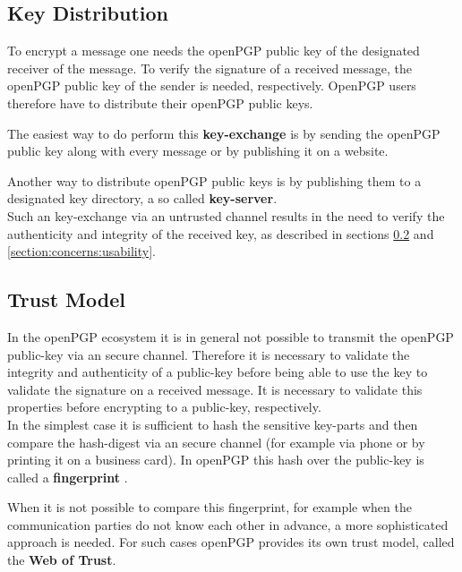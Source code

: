 \subsection{Key Distribution} \label{section:openpgp:keydistribution}

To encrypt a message one needs the openPGP public key of the designated receiver of the message.
To verify the signature of a received message, the openPGP public key of the sender is needed, respectively.
OpenPGP users therefore have to distribute their openPGP public keys.

The easiest way to do perform this \textbf{key-exchange} is by sending the openPGP public key along with every message or by publishing it on a website. 

Another way to distribute openPGP public keys is by publishing them to a designated key directory, a so called \textbf{key-server}. \\

Such an key-exchange via an untrusted channel results in the need to verify the authenticity and integrity of the received key, as described in sections \ref{section:openpgp:trustmodel} and \ref{section:concerns:usability}.

\subsection{Trust Model} \label{section:openpgp:trustmodel}

In the openPGP ecosystem it is in general not possible to transmit the openPGP public-key via an secure channel. Therefore it is necessary to validate the integrity and authenticity of a public-key before being able to use the key to validate the signature on a received message. It is necessary to validate this properties before encrypting to a public-key, respectively. \\

In the simplest case it is sufficient to hash the sensitive key-parts and then compare the hash-digest via an secure channel (for example via phone or by printing it on a business card). In openPGP this hash over the public-key is called a \textbf{fingerprint} \citep[section 12.2]{RFC4880}.

When it is not possible to compare this fingerprint, for example when the communication parties do not know each other in advance, a more sophisticated approach is needed. For such cases openPGP provides its own trust model, called the \textbf{Web of Trust}.

